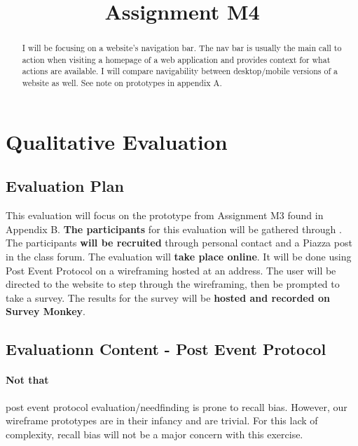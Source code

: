 

\title{Assignment M4\\}



\maketitle
\thispagestyle{fancy}

\begin{abstract}
I will be focusing on a website’s navigation bar. The nav bar is usually the main call to action when visiting a homepage of a web application and provides context for what actions are available. I will compare navigability between desktop/mobile versions of a website as well. See note on prototypes in appendix A.
\end{abstract}

\section{Qualitative Evaluation}

\subsection{Evaluation Plan}

This evaluation will focus on the prototype from Assignment M3 found in Appendix B. \textbf{The participants} for this evaluation will be gathered through . The participants \textbf{will be recruited} through personal contact and a Piazza post in the class forum. The evaluation will \textbf{take place online}. It will be done using Post Event Protocol on a wireframing hosted at an address. The user will be directed to the website to step through the wireframing, then be prompted to take a survey. The results for the survey will be \textbf{hosted and recorded on Survey Monkey}.

\subsection{Evaluationn Content - Post Event Protocol}

\paragraph{Not that} post event protocol evaluation/needfinding is prone to recall bias. However, our wireframe prototypes are in their infancy and are trivial. For this lack of complexity, recall bias will not be a major concern with this exercise.

